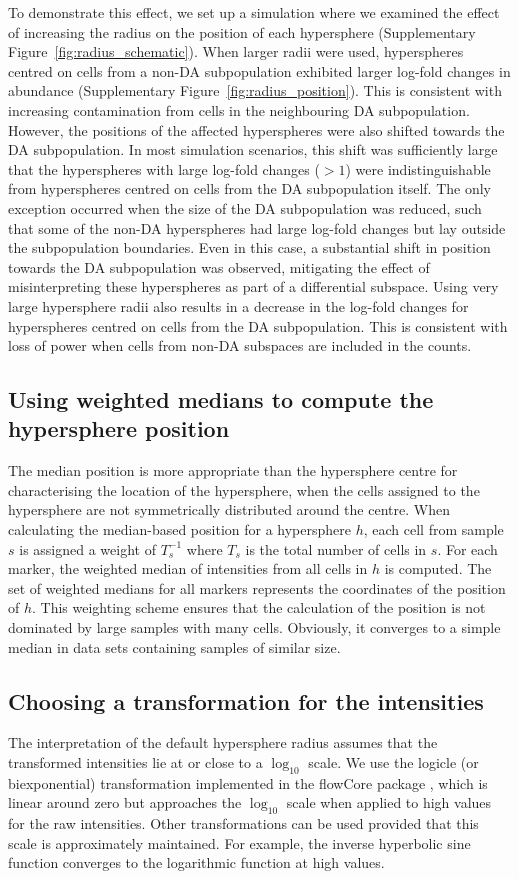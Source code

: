 \documentclass{article}
\begin{document}
To demonstrate this effect, we set up a simulation where we examined the effect of increasing the radius on the position of each hypersphere (Supplementary Figure~\ref{fig:radius_schematic}).
When larger radii were used, hyperspheres centred on cells from a non-DA subpopulation exhibited larger log-fold changes in abundance (Supplementary Figure~\ref{fig:radius_position}).
This is consistent with increasing contamination from cells in the neighbouring DA subpopulation.
However, the positions of the affected hyperspheres were also shifted towards the DA subpopulation.
In most simulation scenarios, this shift was sufficiently large that the hyperspheres with large log-fold changes ($>1$) were indistinguishable from hyperspheres centred on cells from the DA subpopulation itself.
The only exception occurred when the size of the DA subpopulation was reduced, such that some of the non-DA hyperspheres had large log-fold changes but lay outside the subpopulation boundaries.
Even in this case, a substantial shift in position towards the DA subpopulation was observed, mitigating the effect of misinterpreting these hyperspheres as part of a differential subspace.
Using very large hypersphere radii also results in a decrease in the log-fold changes for hyperspheres centred on cells from the DA subpopulation.
This is consistent with loss of power when cells from non-DA subspaces are included in the counts.

\subsection{Using weighted medians to compute the hypersphere position}
The median position is more appropriate than the hypersphere centre for characterising the location of the hypersphere, when the cells assigned to the hypersphere are not symmetrically distributed around the centre.
When calculating the median-based position for a hypersphere $h$, each cell from sample $s$ is assigned a weight of $T_s^{-1}$ where $T_s$ is the total number of cells in $s$.
For each marker, the weighted median of intensities from all cells in $h$ is computed.
The set of weighted medians for all markers represents the coordinates of the position of $h$.
This weighting scheme ensures that the calculation of the position is not dominated by large samples with many cells.
Obviously, it converges to a simple median in data sets containing samples of similar size.

\subsection{Choosing a transformation for the intensities}
The interpretation of the default hypersphere radius assumes that the transformed intensities lie at or close to a $\log_{10}$ scale.
We use the logicle (or biexponential) transformation \cite{parks2006new} implemented in the flowCore package \cite{hahne2009flowcore}, which is linear around zero but approaches the $\log_{10}$ scale when applied to high values for the raw intensities.
Other transformations can be used provided that this scale is approximately maintained.
For example, the inverse hyperbolic sine function converges to the logarithmic function at high values.
\end{document}
